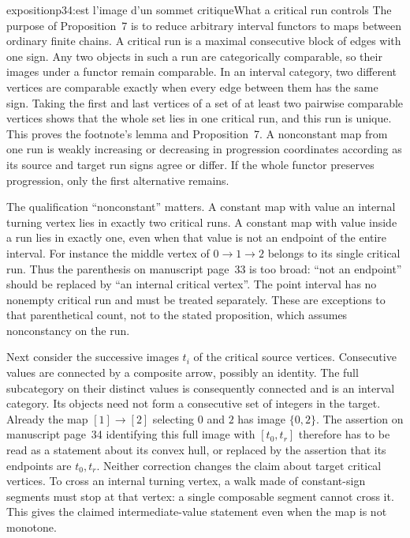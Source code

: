 \begin{dcomment}{exposition}{p34:est l'image d'un sommet critique}{What a critical run controls}
The purpose of Proposition~7 is to reduce arbitrary interval functors to maps between ordinary finite chains. A critical run is a maximal consecutive block of edges with one sign. Any two objects in such a run are categorically comparable, so their images under a functor remain comparable. In an interval category, two different vertices are comparable exactly when every edge between them has the same sign. Taking the first and last vertices of a set of at least two pairwise comparable vertices shows that the whole set lies in one critical run, and this run is unique. This proves the footnote's lemma and Proposition~7. A nonconstant map from one run is weakly increasing or decreasing in progression coordinates according as its source and target run signs agree or differ. If the whole functor preserves progression, only the first alternative remains.

The qualification ``nonconstant'' matters. A constant map with value an internal turning vertex lies in exactly two critical runs. A constant map with value inside a run lies in exactly one, even when that value is not an endpoint of the entire interval. For instance the middle vertex of $0\to1\to2$ belongs to its single critical run. Thus the parenthesis on manuscript page~33 is too broad: ``not an endpoint'' should be replaced by ``an internal critical vertex''. The point interval has no nonempty critical run and must be treated separately. These are exceptions to that parenthetical count, not to the stated proposition, which assumes nonconstancy on the run.

Next consider the successive images $t_i$ of the critical source vertices. Consecutive values are connected by a composite arrow, possibly an identity. The full subcategory on their distinct values is consequently connected and is an interval category. Its objects need not form a consecutive set of integers in the target. Already the map $[1]\to[2]$ selecting $0$ and $2$ has image $\{0,2\}$. The assertion on manuscript page~34 identifying this full image with $[t_0,t_r]$ therefore has to be read as a statement about its convex hull, or replaced by the assertion that its endpoints are $t_0,t_r$. Neither correction changes the claim about target critical vertices. To cross an internal turning vertex, a walk made of constant-sign segments must stop at that vertex: a single composable segment cannot cross it. This gives the claimed intermediate-value statement even when the map is not monotone.


\end{dcomment}
